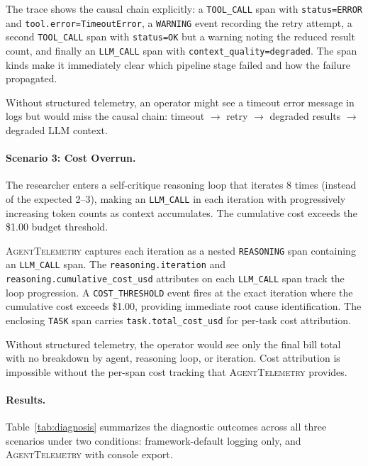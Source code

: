 \documentclass[sigconf,nonacm]{acmart}
\begin{document}
The trace shows the causal chain explicitly: a \texttt{TOOL\_CALL} span
with \texttt{status=ERROR} and \texttt{tool.error=TimeoutError}, a
\texttt{WARNING} event recording the retry attempt, a second
\texttt{TOOL\_CALL} span with \texttt{status=OK} but a warning noting
the reduced result count, and finally an \texttt{LLM\_CALL} span with
\texttt{context\_quality=degraded}.  The span kinds make it immediately
clear which pipeline stage failed and how the failure propagated.

Without structured telemetry, an operator might see a timeout error
message in logs but would miss the causal chain: timeout $\rightarrow$
retry $\rightarrow$ degraded results $\rightarrow$ degraded LLM context.

\paragraph{Scenario 3: Cost Overrun.}
The researcher enters a self-critique reasoning loop that iterates 8
times (instead of the expected 2--3), making an \texttt{LLM\_CALL} in
each iteration with progressively increasing token counts as context
accumulates.  The cumulative cost exceeds the \$1.00 budget threshold.

\textsc{AgentTelemetry} captures each iteration as a nested
\texttt{REASONING} span containing an \texttt{LLM\_CALL} span.  The
\texttt{reasoning.iteration} and
\texttt{reasoning.cumulative\_cost\_usd} attributes on each
\texttt{LLM\_CALL} span track the loop progression.  A
\texttt{COST\_THRESHOLD} event fires at the exact iteration where the
cumulative cost exceeds \$1.00, providing immediate root cause
identification.  The enclosing \texttt{TASK} span carries
\texttt{task.total\_cost\_usd} for per-task cost attribution.

Without structured telemetry, the operator would see only the final
bill total with no breakdown by agent, reasoning loop, or iteration.
Cost attribution is impossible without the per-span cost tracking that
\textsc{AgentTelemetry} provides.

\paragraph{Results.}
Table~\ref{tab:diagnosis} summarizes the diagnostic outcomes across all
three scenarios under two conditions: framework-default logging only,
and \textsc{AgentTelemetry} with console export.
\end{document}
